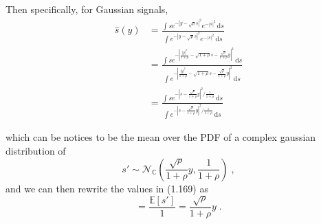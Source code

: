 \documentclass[a4paper, 12pt]{book}
\begin{document}
Then specifically, for Gaussian signals,
\begin{align}
\hat{s}(y) &= \frac{\int s e^{-|y-\sqrt{\rho}s|^2} e^{-|s|^2} \, \mathrm{d}s}{\int e^{-|y-\sqrt{\rho}s|^2} e^{-|s|^2} \, \mathrm{d}s} \tag{1.167} \\
&= \frac{\int s e^{-|\frac{|y|^2}{1+\rho} - \sqrt{1+\rho}s - \frac{\sqrt{\rho}}{1+\rho}y|^2} \, \mathrm{d}s}{\int e^{-|\frac{|y|^2}{1+\rho} - \sqrt{1+\rho}s - \frac{\sqrt{\rho}}{1+\rho}y|^2} \, \mathrm{d}s} \tag{1.168} \\
&= \frac{\int s e^{-|s - \frac{\sqrt{\rho}}{1+\rho}y|^2 / \frac{1}{1+\rho}} \, \mathrm{d}s}{\int e^{-|s - \frac{\sqrt{\rho}}{1+\rho}y|^2 / \frac{1}{1+\rho}} \, \mathrm{d}s} \tag{1.169}
\end{align}

which can be notices to be the mean over the PDF of a complex gaussian distribution of
$$
s' \sim \mathcal{N}_{\mathbb{C}} \left( \frac{\sqrt{\rho}}{1+\rho}y, \frac{1}{1+\rho} \right) \;,
$$
and we can then rewrite the values in (1.169) as
$$
= \frac{\mathbb{E}[s']}{1} = \frac{\sqrt{\rho}}{1+\rho}y \;.
$$
\end{document}
